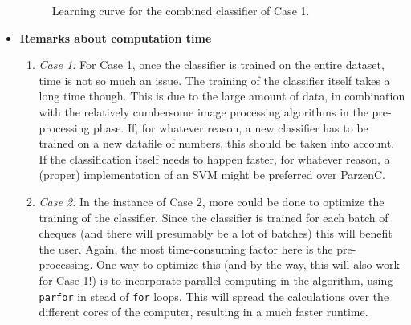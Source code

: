 \begin{itemize}
\begin{figure}[H]
	\caption{Learning curve for the combined classifier of Case 1.}
	\label{fig:learning}
\end{figure}
	\item \textbf{Remarks about computation time}
	\begin{enumerate}
		\item \textit{Case 1:} For Case 1, once the classifier is trained on the entire dataset, time is not so much an issue. The training of the classifier itself takes a long time though. This is due to the large amount of data, in combination with the relatively cumbersome image processing algorithms in the pre-processing phase. If, for whatever reason, a new classifier has to be trained on a new datafile of numbers, this should be taken into account. \\
		If the classification itself needs to happen faster, for whatever reason, a (proper) implementation of an SVM might be preferred over ParzenC.
		\item \textit{Case 2:} In the instance of Case 2, more could be done to optimize the training of the classifier. Since the classifier is trained for each batch of cheques (and there will presumably be a lot of batches) this will benefit the user. Again, the most time-consuming factor here is the pre-processing. One way to optimize this (and by the way, this will also work for Case 1!) is to incorporate parallel computing in the algorithm, using \texttt{parfor} in stead of \texttt{for} loops. This will spread the calculations over the different cores of the computer, resulting in a much faster runtime.
	\end{enumerate}
\end{itemize}
